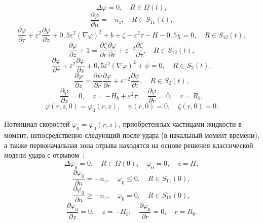 \documentclass[press]{vestnik}
\begin{document}
\begin{equation}\label{1.1}
\Delta \varphi =0, \quad  R\in \Omega (t),
\end{equation}
\begin{equation}\label{1.2}
\frac{\partial \varphi }{\partial n}=-n_{z} ,
\quad
R\in S_{11} (t),
\end{equation}
\begin{equation}\label{1.3}
\frac{\partial \varphi }{\partial \tau }+\varepsilon^{2}\frac{\partial \varphi }{\partial z}+0,5\varepsilon^{2}\left( {\nabla \varphi } \right)^{2}+b+\zeta -\varepsilon^{2}\tau -H-0,5\chi =0,
\quad
R\in S_{12} (t),
\end{equation}
\begin{equation}\label{1.4}
\frac{\partial \varphi }{\partial z}+1=\frac{\partial \zeta }{\partial r}\frac{\partial \varphi }{\partial r}+\varepsilon^{-2}\frac{\partial \zeta }{\partial \tau },
\quad
R\in S_{12} (t),
\end{equation}
\begin{equation}\label{1.5}
\frac{\partial \varphi }{\partial \tau }+\varepsilon^{2}\frac{\partial \varphi }{\partial z}+0,5\varepsilon^{2}\left( {\nabla \varphi } \right)^{2}+\psi =0,
\quad
R\in S_{2} (t),
\end{equation}
\begin{equation}\label{1.6}
\frac{\partial \varphi }{\partial z}=\frac{\partial \psi }{\partial r}\frac{\partial \varphi }{\partial r}+\varepsilon^{-2}\frac{\partial \psi }{\partial \tau },
\quad
R\in S_{2} (t),
\end{equation}
\begin{equation}\label{1.7}
\frac{\partial \varphi }{\partial z}=0,
\quad
z=-H_{b} +\varepsilon^{2}\tau ;
\quad
\frac{\partial \varphi }{\partial r}=0,
\quad
r=R_{b},
\end{equation}
\begin{equation}\label{1.8}
\varphi (r,z,0)=\varphi_{0} (r,z),
\quad
\psi (r,0)=0,
\quad
\zeta (r,0)=0.
\end{equation}

Потенциал скоростей $\varphi_{0} =\varphi_{0} (r,z)$, приобретенных частицами 
жидкости в момент, непосредственно следующий после удара (в начальный момент 
времени), а также первоначальная зона отрыва находятся на основе решения 
классической модели удара с отрывом~\cite{B01}: 
\begin{equation}\label{1.9}
\Delta \varphi_{0} =0,
\quad
R\in \Omega (0);
\quad
\varphi_{0} =0,
\quad
z=H,
\end{equation}
\begin{equation}\label{1.10}
\frac{\partial \varphi_{0} }{\partial n}=-n_{z} ,
\quad
\varphi_{0} \leqslant 0,
\quad
R\in S_{11} (0),
\end{equation}
\begin{equation}\label{1.11}
\frac{\partial \varphi_{0} }{\partial n}\geqslant -n_{z} ,
\quad
\varphi_{0} =0,
\quad
R\in S_{12} (0),
\end{equation}
\begin{equation}\label{1.12}
\frac{\partial \varphi_{0} }{\partial z}=0,
\quad
z=-H_{b} ;
\quad
\frac{\partial \varphi_{0} }{\partial r}=0,
\quad
r=R_{b}.
\end{equation}
\end{document}

